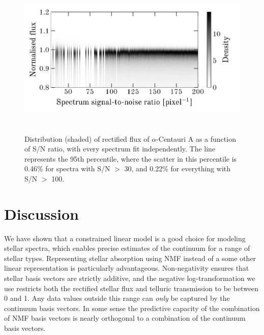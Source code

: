 \documentclass[modern]{aastex631}
\begin{document}


\begin{figure}
    \includegraphics*[width=\textwidth, height=3in]{alpha-cen-repeat-snr.pdf}
    \caption{Distribution (shaded) of rectified flux of $\alpha$-Centauri A as a function of S/N ratio, with every spectrum fit independently. The line represents the 95th percentile, where the scatter in this percentile is 0.46\% for spectra with S/N $>$ 30, and 0.22\% for everything with S/N $>$ 100. \label{fig:alpha-cen-wrt-snr}}
\end{figure}

\section{Discussion}\label{sec:discussion}

We have shown that a constrained linear model is a good choice for modeling stellar spectra, which enables precise estimates of the continuum for a range of stellar types. Representing stellar absorption using NMF instead of a some other linear representation is particularly advantageous. Non-negativity ensures that stellar basis vectors are strictly additive, and the negative log-transformation we use restricts both the rectified stellar flux and telluric transmission to be between 0 and 1. Any data values outside this range can \emph{only} be captured by the continuum basis vectors. In some sense the predictive capacity of the combination of NMF basis vectors is nearly orthogonal to a combination of the continuum basis vectors.\\
\end{document}
